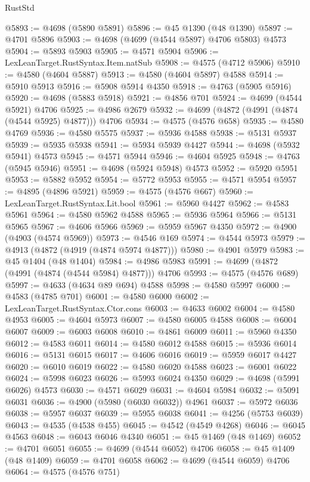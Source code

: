 \begin{lexlean}{RustStd}
\begin{coremodule}
@5893 := @4698 (@5890 @5891)
@5896 := @45 @1390 (@48 @1390)
@5897 := @4701 @5896
@5903 := @4698 (@4699 (@4544 @5897) @4706 @5803) @4573
@5904 := @5893 @5903
@5905 := @4571 @5904
@5906 := LexLeanTarget.RustSyntax.Item.natSub
@5908 := @4575 (@4712 @5906)
@5910 := @4580 (@4604 @5887)
@5913 := @4580 (@4604 @5897) @4588
@5914 := @5910 @5913
@5916 := @5908 @5914 @4350
@5918 := @4763 (@5905 @5916)
@5920 := @4698 (@5883 @5918)
@5921 := @4856 @701
@5924 := @4699 (@4544 @5921) @4706
@5925 := @4986 @2679
@5932 := @4699 (@4872 (@4991 (@4874 (@4544 @5925) @4877))) @4706
@5934 := @4575 (@4576 @658)
@5935 := @4580 @4769
@5936 := @4580 @5575
@5937 := @5936 @4588
@5938 := @5131 @5937
@5939 := @5935 @5938
@5941 := @5934 @5939 @4427
@5944 := @4698 (@5932 @5941) @4573
@5945 := @4571 @5944
@5946 := @4604 @5925
@5948 := @4763 (@5945 @5946)
@5951 := @4698 (@5924 @5948) @4573
@5952 := @5920 @5951
@5953 := @5882 @5952
@5954 := @5772 @5953
@5955 := @4571 @5954
@5957 := @4895 (@4896 @5921)
@5959 := @4575 (@4576 @667)
@5960 := LexLeanTarget.RustSyntax.Lit.bool
@5961 := @5960 @4427
@5962 := @4583 @5961
@5964 := @4580 @5962 @4588
@5965 := @5936 @5964
@5966 := @5131 @5965
@5967 := @4606 @5966
@5969 := @5959 @5967 @4350
@5972 := @4900 (@4903 (@4574 @5969))
@5973 := @4546 @169
@5974 := @4544 @5973
@5979 := @4913 (@4872 (@4919 (@4874 @5974 @4877)))
@5980 := @4901 @5979
@5983 := @45 @1404 (@48 @1404)
@5984 := @4986 @5983
@5991 := @4699 (@4872 (@4991 (@4874 (@4544 @5984) @4877))) @4706
@5993 := @4575 (@4576 @689)
@5997 := @4633 (@4634 @89 @694) @4588
@5998 := @4580 @5997
@6000 := @4583 (@4785 @701)
@6001 := @4580 @6000
@6002 := LexLeanTarget.RustSyntax.Ctor.cons
@6003 := @4633 @6002
@6004 := @4580 @4953
@6005 := @4604 @5973
@6007 := @4580 @6005 @4588
@6008 := @6004 @6007
@6009 := @6003 @6008
@6010 := @4861 @6009
@6011 := @5960 @4350
@6012 := @4583 @6011
@6014 := @4580 @6012 @4588
@6015 := @5936 @6014
@6016 := @5131 @6015
@6017 := @4606 @6016
@6019 := @5959 @6017 @4427
@6020 := @6010 @6019
@6022 := @4580 @6020 @4588
@6023 := @6001 @6022
@6024 := @5998 @6023
@6026 := @5993 @6024 @4350
@6029 := @4698 (@5991 @6026) @4573
@6030 := @4571 @6029
@6031 := @4604 @5984
@6032 := @5091 @6031
@6036 := @4900 (@5980 (@6030 @6032)) @4961
@6037 := @5972 @6036
@6038 := @5957 @6037
@6039 := @5955 @6038
@6041 := @4256 (@5753 @6039)
@6043 := @4535 (@4538 @455)
@6045 := @4542 (@4549 @4268)
@6046 := @6045 @4563
@6048 := @6043 @6046 @4340
@6051 := @45 @1469 (@48 @1469)
@6052 := @4701 @6051
@6055 := @4699 (@4544 @6052) @4706
@6058 := @45 @1409 (@48 @1409)
@6059 := @4701 @6058
@6062 := @4699 (@4544 @6059) @4706
@6064 := @4575 (@4576 @751)

\end{coremodule}
\end{lexlean}
